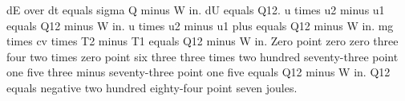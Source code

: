 dE over dt equals sigma Q minus W in. dU equals Q12. u times u2 minus u1 equals Q12 minus W in. u times u2 minus u1 plus equals Q12 minus W in. mg times cv times T2 minus T1 equals Q12 minus W in. Zero point zero zero three four two times zero point six three three times two hundred seventy-three point one five three minus seventy-three point one five equals Q12 minus W in. Q12 equals negative two hundred eighty-four point seven joules.